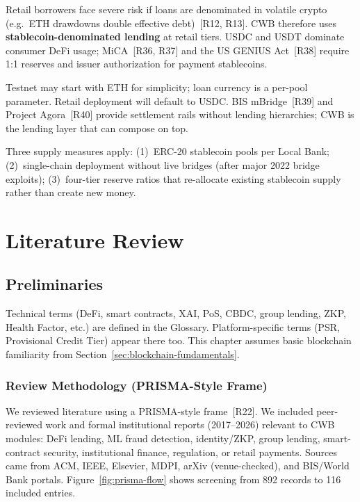 \documentclass[12pt,a4paper]{report}
\begin{document}
Retail borrowers face severe risk if loans are denominated in volatile crypto (e.g.\ ETH drawdowns double effective debt)~[R12, R13]. CWB therefore uses \textbf{stablecoin-denominated lending} at retail tiers. USDC and USDT dominate consumer DeFi usage; MiCA~[R36, R37] and the US GENIUS Act~[R38] require 1:1 reserves and issuer authorization for payment stablecoins.

Testnet may start with ETH for simplicity; loan currency is a per-pool parameter. Retail deployment will default to USDC. BIS mBridge~[R39] and Project Agora~[R40] provide settlement rails without lending hierarchies; CWB is the lending layer that can compose on top.

Three supply measures apply: (1)~ERC-20 stablecoin pools per Local Bank; (2)~single-chain deployment without live bridges (after major 2022 bridge exploits); (3)~four-tier reserve ratios that re-allocate existing stablecoin supply rather than create new money.


\chapter{Literature Review}

\section{Preliminaries}

Technical terms (DeFi, smart contracts, XAI, PoS, CBDC, group lending, ZKP, Health Factor, etc.) are defined in the Glossary. Platform-specific terms (PSR, Provisional Credit Tier) appear there too. This chapter assumes basic blockchain familiarity from Section~\ref{sec:blockchain-fundamentals}.

\subsection{Review Methodology (PRISMA-Style Frame)}
\label{sec:lit-prisma}

We reviewed literature using a PRISMA-style frame~[R22]. We included peer-reviewed work and formal institutional reports (2017--2026) relevant to CWB modules: DeFi lending, ML fraud detection, identity/ZKP, group lending, smart-contract security, institutional finance, regulation, or retail payments. Sources came from ACM, IEEE, Elsevier, MDPI, arXiv (venue-checked), and BIS/World Bank portals. Figure~\ref{fig:prisma-flow} shows screening from 892 records to 116 included entries.
\end{document}
